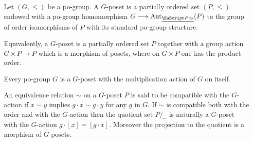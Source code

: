 \begin{definition}\label{def:g.poset}
Let $(G,\leq)$ be a po-group. A $G$-poset is a partially ordered set $(P, \le)$ endowed with a po-group homomorphism $G\to \text{Aut}_{\Pos} (P)$ to the group of order isomorphisms of $P$ with its standard po-group structure.
\end{definition}
\begin{remark}
Equivalently, a $G$-poset is a partially ordered set $P$ together with a group action $G\times P\to P$ which is a morphism of posets, where on $G\times P$ one has the product order.
\end{remark}
\begin{example}
Every po-group $G$ is a $G$-poset with the multiplication action of $G$ on itself. 
\end{example}
\begin{remark}\label{quotient2}
An equivalence relation $\sim$ on a $G$-poset $P$ is said to be compatible with the $G$-action if $x\sim y$ implies $g\cdot x\sim g\cdot y$ for any $g$ in $G$. If $\sim$ is compatible both with the order and with the $G$-action then the quotient set $P/_{\!\sim}$ is naturally a $G$-poset with the $G$-action $g\cdot[x]=[g\cdot x]$. Moreover the projection to the quotient is a morphism of $G$-posets.
\end{remark}

